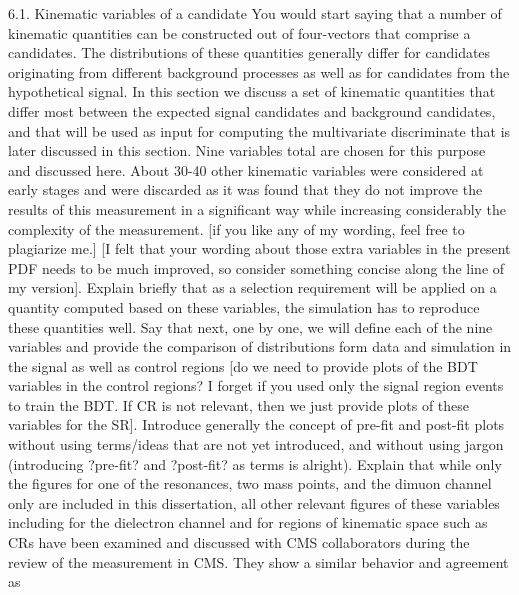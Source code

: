            6.1. Kinematic variables of a candidate
           You would start saying that a  number of kinematic quantities can be constructed
           out of four-vectors that comprise a candidates.  The distributions of these quantities
           generally differ for candidates originating from different background processes
           as well as for candidates from the hypothetical signal. In this section we discuss
           a set of kinematic quantities that differ most between the expected signal candidates
           and background candidates, and that will be used as input for computing the multivariate 
           discriminate that is later discussed in this section. Nine variables total are chosen for
           this purpose and discussed here. About 30-40 other kinematic variables were considered at early 
           stages and were discarded as it was found that they do not improve the results of this measurement
           in a  significant way while increasing considerably the complexity of the measurement.
           [if you like any of my  wording, feel free to plagiarize me.] [I felt that your wording about those
           extra variables in the present PDF needs to be much improved, so consider something 
           concise along the line of my  version].
              Explain briefly that as a selection requirement will be applied on a quantity computed
           based on these variables, the simulation has to  reproduce these quantities well.
           Say that next, one by one, we will define each of the nine variables and provide  the
           comparison of distributions form data and simulation in the signal as well as control
           regions [do we need to provide plots of the BDT variables in the control regions?
           I forget if you used only the signal region events to train the BDT. If CR is not relevant,
           then we just provide plots of these variables for the SR].
             Introduce generally the concept of pre-fit and post-fit plots without using terms/ideas
           that are not yet introduced, and without using jargon (introducing ?pre-fit? and ?post-fit?
           as terms is alright). Explain that while only the figures for one of the resonances, two
           mass points, and the dimuon channel only are included in this dissertation, all other
           relevant figures of these variables including for the dielectron channel and for regions of kinematic
           space such as CRs have been examined and discussed with CMS collaborators during 
           the review of the measurement in CMS. They show a similar behavior and agreement as
